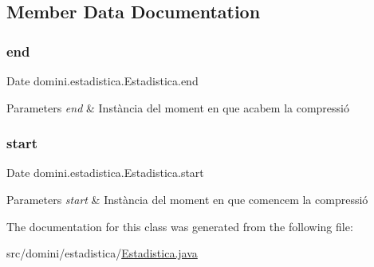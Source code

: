 \subsection{Member Data Documentation}
\mbox{\label{classdomini_1_1estadistica_1_1Estadistica_ae99e664f0569e308009ec7ca32864006}} 
\subsubsection{\texorpdfstring{end}{end}}
{\footnotesize\ttfamily Date domini.\+estadistica.\+Estadistica.\+end\hspace{0.3cm}{\ttfamily [package]}}


\begin{DoxyParams}{Parameters}
{\em end} & Instància del moment en que acabem la compressió \\
\hline
\end{DoxyParams}
\mbox{\label{classdomini_1_1estadistica_1_1Estadistica_aee0ae604272563ceab4e61392cbd343e}} 
\subsubsection{\texorpdfstring{start}{start}}
{\footnotesize\ttfamily Date domini.\+estadistica.\+Estadistica.\+start\hspace{0.3cm}{\ttfamily [package]}}


\begin{DoxyParams}{Parameters}
{\em start} & Instància del moment en que comencem la compressió \\
\hline
\end{DoxyParams}


The documentation for this class was generated from the following file\+:\begin{DoxyCompactItemize}
\item 
src/domini/estadistica/\hyperlink{Estadistica_8java}{Estadistica.\+java}\end{DoxyCompactItemize}
